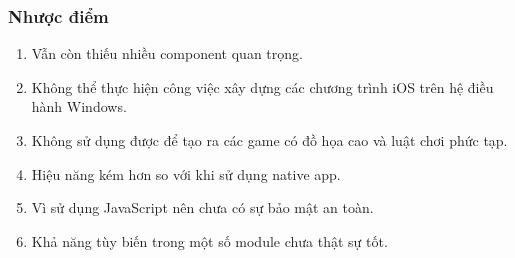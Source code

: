     \subsubsection{Nhược điểm}
        \begin{enumerate}
            \item Vẫn còn thiếu nhiều component quan trọng.
            \item Không thể thực hiện công việc xây dựng các chương trình iOS trên hệ điều hành Windows.
            \item Không sử dụng được để tạo ra các game có đồ họa cao và luật chơi phức tạp.
            \item Hiệu năng kém hơn so với khi sử dụng native app.
            \item Vì sử dụng JavaScript nên chưa có sự bảo mật an toàn.
            \item Khả năng tùy biến trong một số module chưa thật sự tốt.
        \end{enumerate}
\newpage